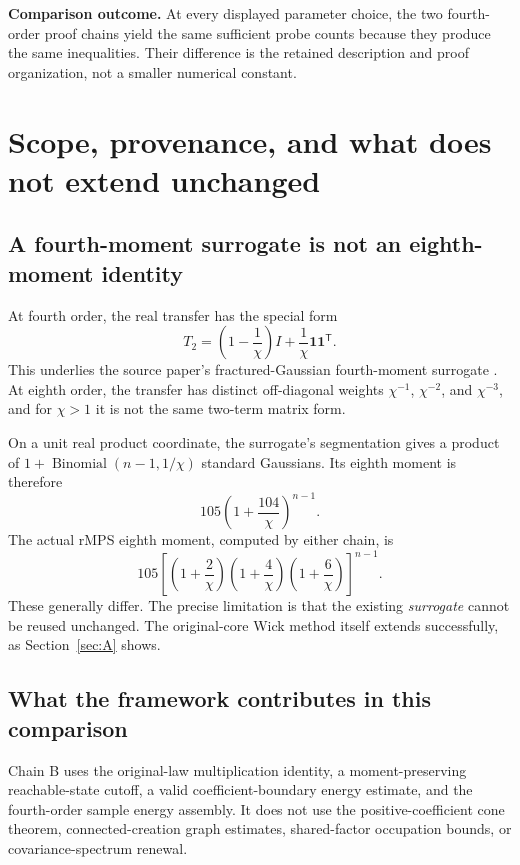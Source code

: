 \documentclass[11pt]{article}
\numberwithin{equation}{section}
\theoremstyle{definition}\newtheorem{definition}[theorem]{Definition}
\theoremstyle{remark}\newtheorem{remark}[theorem]{Remark}
\newcommand{\one}{\mathbf1}\newcommand{\F}{\mathbb F}
\begin{document}
\begin{takeaway}
\textbf{Comparison outcome.} At every displayed parameter choice, the two
fourth-order proof chains yield the same sufficient probe counts because they
produce the same inequalities. Their difference is the retained description and
proof organization, not a smaller numerical constant.
\end{takeaway}

\par{}
\section{Scope, provenance, and what does not extend unchanged}\label{sec:scope}
\subsection{A fourth-moment surrogate is not an eighth-moment identity}
At fourth order, the real transfer has the special form
\[
 T_2=\left(1-\frac1\chi\right)I+\frac1\chi\one\one^{\mathsf T}.
\]
This underlies the source paper's fractured-Gaussian fourth-moment surrogate
\cite[Section~4.4.2, Theorem~4.4]{CEMT}. At eighth order, the transfer has distinct off-diagonal weights
$\chi^{-1}$, $\chi^{-2}$, and $\chi^{-3}$, and for $\chi>1$ it is not the same
two-term matrix form.

On a unit real product coordinate, the surrogate's segmentation gives a
product of $1+\operatorname{Binomial}(n-1,1/\chi)$ standard Gaussians.
Its eighth moment is therefore
\begin{equation}\label{eq:surrogate8}
 105\left(1+\frac{104}{\chi}\right)^{n-1}.
\end{equation}
The actual rMPS eighth moment, computed by either chain, is
\begin{equation}\label{eq:original8}
 105\left[\left(1+\frac2\chi\right)
           \left(1+\frac4\chi\right)
           \left(1+\frac6\chi\right)\right]^{n-1}.
\end{equation}
These generally differ. The precise limitation is that the existing
\emph{surrogate} cannot be reused unchanged. The original-core Wick method
itself extends successfully, as Section~\ref{sec:A} shows.

\subsection{What the framework contributes in this comparison}
Chain B uses the original-law multiplication identity, a moment-preserving
reachable-state cutoff, a valid coefficient-boundary energy estimate, and the
fourth-order sample energy assembly. It does not use the positive-coefficient
cone theorem, connected-creation graph estimates, shared-factor occupation
bounds, or covariance-spectrum renewal.
\end{document}

